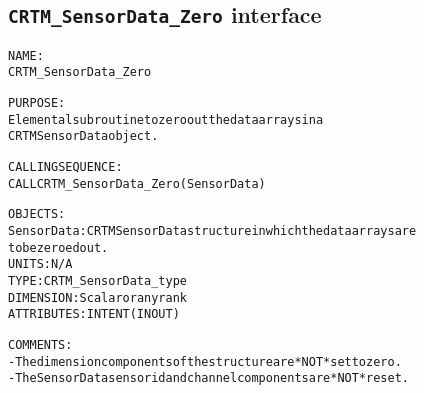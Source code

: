 \subsection{\texttt{CRTM\_SensorData\_Zero} interface}
  \label{sec:CRTM_SensorData_Zero_interface}
  \begin{alltt}
 
  NAME:
        CRTM_SensorData_Zero
 
  PURPOSE:
        Elemental subroutine to zero out the data arrays in a
        CRTM SensorData object.
 
  CALLING SEQUENCE:
        CALL CRTM_SensorData_Zero( SensorData )
 
  OBJECTS:
        SensorData:    CRTM SensorData structure in which the data arrays are
                       to be zeroed out.
                       UNITS:      N/A
                       TYPE:       CRTM_SensorData_type
                       DIMENSION:  Scalar or any rank
                       ATTRIBUTES: INTENT(IN OUT)
 
  COMMENTS:
        - The dimension components of the structure are *NOT* set to zero.
        - The SensorData sensor id and channel components are *NOT* reset.
 
  \end{alltt}
